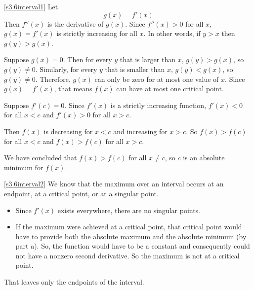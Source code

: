\begin{solution}
\eqref{s3.6interval1}
Let
\[g(x)=f'(x)\]
Then $f''(x)$ is the derivative of $g(x)$. Since $f''(x)>0$ for all $x$, $g(x)=f'(x)$ is strictly increasing
for all $x$.
In other words, if $y>x$ then $g(y)>g(x)$.

Suppose $g(x)=0$. Then for every $y$ that is larger than $x$, $g(y)>g(x)$, so $g(y) \neq 0$. Similarly, for every $y$ that is smaller than $x$, $g(y)<g(x)$, so $g(y) \neq 0$. Therefore, $g(x)$ can only be zero for at most one value of $x$. Since $g(x)=f'(x)$, that means $f(x)$ can have at most one critical point.

Suppose $f'(c)=0$. Since
$f'(x)$ is a strictly increasing function, $f'(x)<0$ for all $x<c$ and $f'(x)>0$ for all $x>c$.
\begin{center}\end{center}

Then $f(x)$ is decreasing for $x<c$ and increasing for $x>c$.
So $f(x)>f(c)$ for all $x<c$ and $f(x)>f(c)$ for all $x>c$.

\begin{center}\end{center}
 We have concluded that $f(x)>f(c)$ for
all $x\ne c$, so $c$ is an absolute minimum for $f(x)$.

\eqref{s3.6interval2}
We know that the maximum over an interval occurs at an endpoint,
at a critical point, or at a singular point.
\begin{itemize}
\item  Since $f'(x)$ exists everywhere, there are no singular points.
\item If the maximum were achieved at a critical point, that critical point would
have to provide both the absolute maximum and the absolute minimum (by part a).
So, the function would have to be a constant and consequently could not have
a nonzero second derivative. So the maximum is not at a critical point.
\end{itemize}
That leaves only the endpoints of the interval.


\end{solution}
